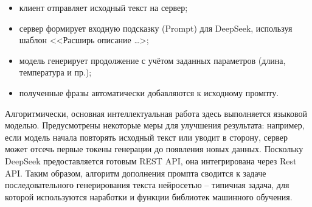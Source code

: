 \begin{itemize}
    \item клиент отправляет исходный текст на сервер;
    \item сервер формирует входную подсказку (Prompt) для DeepSeek, используя шаблон <<Расширь описание \dots>;
    \item модель генерирует продолжение с учётом заданных параметров (длина, температура и пр.);
    \item полученные фразы автоматически добавляются к исходному промпту.

\end{itemize}

Алгоритмически, основная интеллектуальная работа здесь выполняется языковой моделью. Предусмотрены некоторые меры для улучшения результата: например, если модель начала повторять исходный текст или уводит в сторону, сервер может отсечь первые токены генерации до появления новых данных. Поскольку DeepSeek предоставляется готовым REST API, она интегрирована через Rest API.  Таким образом, алгоритм дополнения промпта сводится к задаче последовательного генерирования текста нейросетью – типичная задача, для которой используются наработки и функции библиотек машинного обучения.

